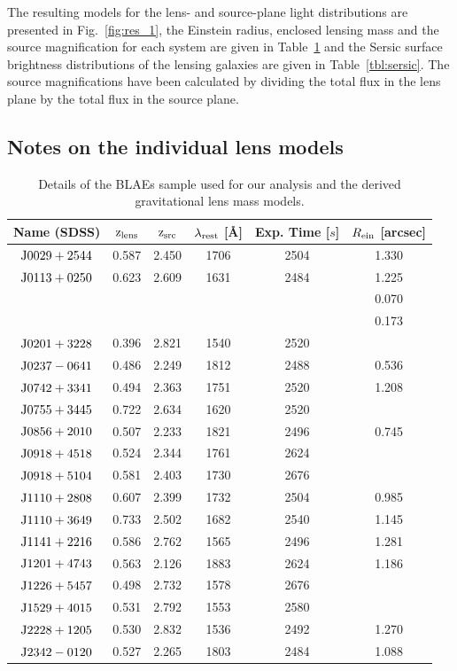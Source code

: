 \documentclass[a4paper,fleqn,usenatbib]{mnras}
\begin{document}
The resulting models for the lens- and source-plane light distributions are presented in Fig.~\ref{fig:res_1}, the Einstein radius, enclosed lensing mass and the source magnification for each system are given in Table~\ref{tbl:list} and the Sersic surface brightness distributions of the lensing galaxies are given in Table~\ref{tbl:sersic}. The source magnifications have been calculated by dividing the total flux in the lens plane by the total flux in the source plane.

\subsection{Notes on the individual lens models}

\begin{table}
\caption{Details of the BLAEs sample used for our analysis and the derived gravitational lens mass models.}
\begin{tabular}{cccccc}
\hline
 Name (SDSS) 	&$\rm{z_{lens}}$	&$\rm{z_{src}}$		& $\lambda_{\rm rest}$ [\AA]		&Exp. Time [$s$]	&$R_{\rm ein}$ [arcsec]\\
 \hline
$\rm{J0029+2544}$		&0.587	&2.450	&1706	&2504	&1.330\\
$\rm{J0113+0250}$		&0.623	&2.609	&1631	&2484	&1.225\\
&&&&&0.070\\
&&&&&0.173\\
$\rm{J0201+3228}$		&0.396	&2.821	&1540	&2520	&\\
$\rm{J0237-0641}$		&0.486	&2.249	&1812	&2488	&0.536\\
$\rm{J0742+3341}$		&0.494	&2.363	&1751	&2520	&1.208\\
$\rm{J0755+3445}$		&0.722	&2.634	&1620	&2520	&\\
$\rm{J0856+2010}$		&0.507	&2.233	&1821	&2496	&0.745\\
$\rm{J0918+4518}$		&0.524	&2.344	&1761	&2624	&\\
$\rm{J0918+5104}$		&0.581	&2.403	&1730	&2676	&\\
$\rm{J1110+2808}$		&0.607	&2.399	&1732	&2504	&0.985\\
$\rm{J1110+3649}$		&0.733	&2.502	&1682	&2540	&1.145\\
$\rm{J1141+2216}$		&0.586	&2.762	&1565	&2496	&1.281\\
$\rm{J1201+4743}$		&0.563	&2.126	&1883	&2624	&1.186\\
$\rm{J1226+5457}$		&0.498	&2.732	&1578	&2676	&\\
$\rm{J1529+4015}$		&0.531	&2.792	&1553	&2580	&\\
$\rm{J2228+1205}$		&0.530	&2.832	&1536	&2492	&1.270\\
$\rm{J2342-0120}$		&0.527	&2.265	&1803	&2484	&1.088\\
 \hline
\end{tabular}
\label{tbl:list} 
\end{table}
\end{document}
